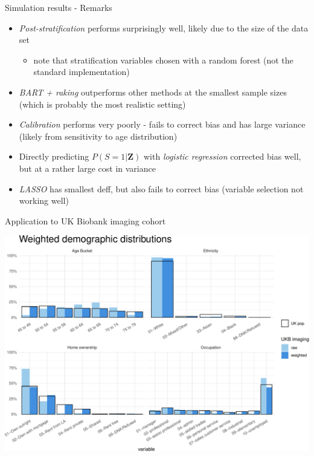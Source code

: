 \documentclass[
  ignorenonframetext,
]{beamer}
\providecommand{\tightlist}{%
  \setlength{\itemsep}{0pt}\setlength{\parskip}{0pt}}
\begin{document}
\begin{frame}{Simulation results - Remarks}
\protect\hypertarget{simulation-results---remarks}{}

\begin{itemize}
\tightlist
\item
  \emph{Post-stratification} performs surprisingly well, likely due to
  the size of the data set

  \begin{itemize}
  \tightlist
  \item
    note that stratification variables chosen with a random forest (not
    the standard implementation)
  \end{itemize}
\item
  \emph{BART + raking} outperforms other methods at the smallest sample
  sizes (which is probably the most realistic setting)
\item
  \emph{Calibration} performs very poorly - fails to correct bias and
  has large variance (likely from sensitivity to age distribution)
\item
  Directly predicting \(P(S = 1 | \mathbf{Z})\) with \emph{logistic
  regression} corrected bias well, but at a rather large cost in
  variance
\item
  \emph{LASSO} has smallest deff, but also fails to correct bias
  (variable selection not working well)
\end{itemize}

\end{frame}

\begin{frame}{Application to UK Biobank imaging cohort}
\protect\hypertarget{application-to-uk-biobank-imaging-cohort}{}

\includegraphics{fmrib-deck-20191002_files/figure-beamer/fig-ukb-results-demo-1.pdf}

\end{frame}
\end{document}
